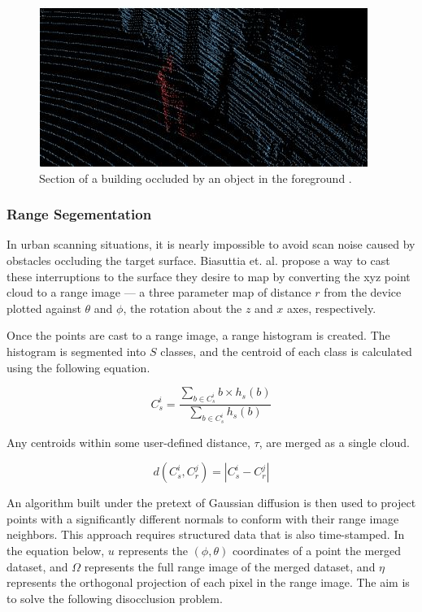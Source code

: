 \documentclass[12pt]{drexelthesis}
\let\Oldsubsubsection\subsubsection
\renewcommand{\subsubsection}{\FloatBarrier\Oldsubsubsection}
\begin{document}
\begin{figure}[!ht]
	\centering
		\includegraphics{occlusion/occluded_man.jpg}
	\caption[Demonstration of occlusion]{\centering Section of a building occluded by an object in the foreground \cite{RN13}.}
\end{figure}

\subsubsection{Range Segementation}
\label{subsubsec:rangeseg}
In urban scanning situations, it is nearly impossible to avoid scan noise caused by obstacles occluding the target surface. Biasuttia et. al. propose a way to cast these interruptions to the surface they desire to map by converting the xyz point cloud to a range image --- a three parameter map of distance $r$ from the device plotted against $\theta$ and $\phi$, the rotation about the $z$ and $x$ axes, respectively.

Once the points are cast to a range image, a range histogram is created. The histogram is segmented into $S$ classes, and the centroid of each class is calculated using the following equation.

\begin{equation}
	C_{s}^{i} = \frac{\sum_{b\in C_{s}^{i}} b  \times h_{s}(b)}{\sum_{b\in C_{s}^{i}}h_{s}(b)}
\end{equation}

Any centroids within some user-defined distance, $\tau$, are merged as a single cloud.

\begin{equation}
	d(C_{s}^{i}, C_{r}^{j}) = |C_{s}^{i} - C_{r}^{j}|
\end{equation}

An algorithm built under the pretext of Gaussian diffusion is then used to project points with a significantly different normals to conform with their range image neighbors. This approach requires structured data that is also time-stamped. In the equation below, $u$ represents the $(\phi, \theta)$ coordinates of a point the merged dataset, and $\Omega$  represents the full range image of the merged dataset, and $\eta$ represents the orthogonal projection of each pixel in the range image. The aim is to solve the following disocclusion problem.
\end{document}
